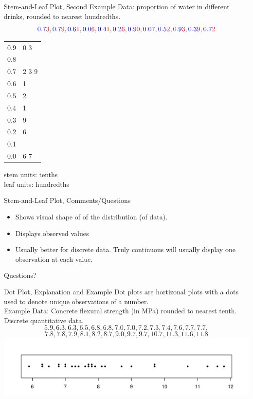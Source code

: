 \documentclass{beamer}
\newcommand{\blue}[1]{{\color{blue} #1}}
\newcommand{\red}[1]{{\color{red} #1}}
\newcommand{\bluRed}[2]{{\color{blue} #1}{\color{red} #2}}
\newcommand{\qtns}[0]{\begin{center} Questions? \end{center}}
\newcommand{\nl}[1]{\vspace{#1 em}}
\begin{document}
\begin{frame}{Stem-and-Leaf Plot, Second Example}
    Data: proportion of water in different drinks, rounded to nearest hundredths.
    \[\bluRed{0.7}{3},
        \bluRed{0.7}{9},
        \bluRed{0.6}{1},
        \bluRed{0.0}{6},
        \bluRed{0.4}{1},
        \bluRed{0.2}{6},
        \bluRed{0.9}{0},
        \bluRed{0.0}{7},
        \bluRed{0.5}{2},
        \bluRed{0.9}{3},
        \bluRed{0.3}{9},
        \bluRed{0.7}{2}\]
    \begin{table}
        \begin{tabular}{r | l}
            \blue{0.9} & \red{0 3}   \\
            \blue{0.8} & \red{}      \\
            \blue{0.7} & \red{2 3 9} \\
            \blue{0.6} & \red{1}     \\
            \blue{0.5} & \red{2}     \\
            \blue{0.4} & \red{1}     \\
            \blue{0.3} & \red{9}     \\
            \blue{0.2} & \red{6}     \\
            \blue{0.1} & \red{}      \\
            \blue{0.0} & \red{6 7}   \\
        \end{tabular}
    \end{table}
    \blue{stem units: tenths}\\
    \red{leaf units: hundredths}
\end{frame}

\begin{frame}{Stem-and-Leaf Plot, Comments/Questions}
    \begin{itemize}
        \item Shows visual shape of of the distribution (of data).
        \item Displays observed values
        \item Usually better for discrete data. Truly continuous will usually display one observation at each value.
    \end{itemize}
    \qtns
\end{frame}

\begin{frame}{Dot Plot, Explanation and Example}
    Dot plots are hortizonal plots with a dots used to denote unique observations of a number.\\
    \nl{0.5}
    Example Data: Concrete flexural strength (in MPa) rounded to nearest tenth. Discrete quantitative data.
    \[5.9,6.3,6.3,6.5,6.8,6.8,7.0,7.0,7.2,7.3,7.4,7.6,7.7,7.7,\]
    \[7.8,7.8,7.9,8.1,8.2,8.7,9.0,9.7,9.7,10.7,11.3,11.6,11.8\]
    \includegraphics[scale=.5]{ch01_strength_dot_stack.pdf}
\end{frame}
\end{document}
